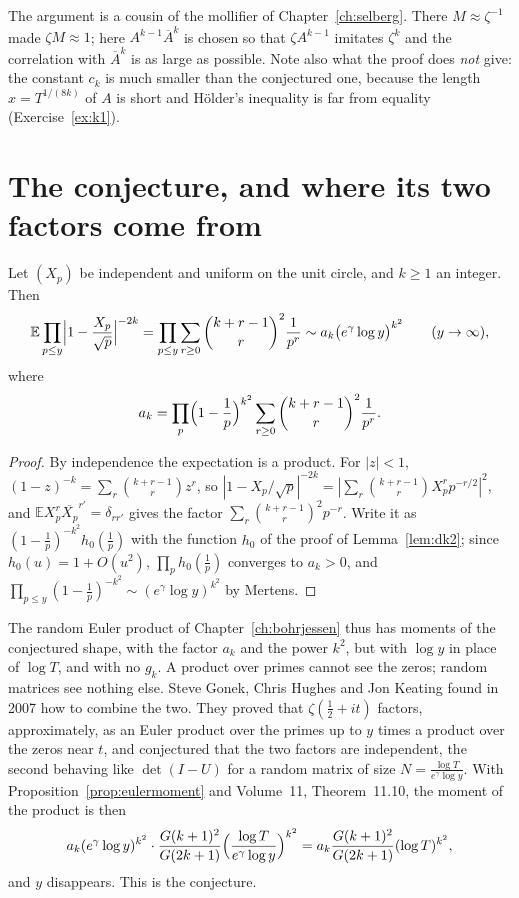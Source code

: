The argument is a cousin of the mollifier of Chapter~\ref{ch:selberg}. There $M\approx\zeta^{-1}$ made $\zeta M\approx1$; here $A^{k-1}\overline A^k$ is chosen so that $\zeta A^{k-1}$ imitates $\zeta^k$ and the correlation with $\overline A^k$ is as large as possible. Note also what the proof does \emph{not} give: the constant $c_k$ is much smaller than the conjectured one, because the length $x=T^{1/(8k)}$ of $A$ is short and Hölder's inequality is far from equality (Exercise~\ref{ex:k1}).

\section{The conjecture, and where its two factors come from}

\begin{proposition}\label{prop:eulermoment}
Let $(X_p)$ be independent and uniform on the unit circle, and $k\ge1$ an integer. Then
\[
\mathbb E\prod_{p\le y}\Bigl|1-\frac{X_p}{\sqrt p}\Bigr|^{-2k}=\prod_{p\le y}\sum_{r\ge0}\binom{k+r-1}r^2\frac1{p^r}\sim a_k\bigl(e^\gamma\log y\bigr)^{k^2}\qquad(y\to\infty),
\]
where
\[
a_k=\prod_p\Bigl(1-\frac1p\Bigr)^{k^2}\sum_{r\ge0}\binom{k+r-1}r^2\frac1{p^r}.
\]
\end{proposition}
\begin{proof}
By independence the expectation is a product. For $|z|<1$, $(1-z)^{-k}=\sum_r\binom{k+r-1}rz^r$, so $|1-X_p/\sqrt p|^{-2k}=|\sum_r\binom{k+r-1}rX_p^rp^{-r/2}|^2$, and $\mathbb EX_p^r\overline{X_p}^{r'}=\delta_{rr'}$ gives the factor $\sum_r\binom{k+r-1}r^2p^{-r}$. Write it as $(1-\frac1p)^{-k^2}h_0(\frac1p)$ with the function $h_0$ of the proof of Lemma~\ref{lem:dk2}; since $h_0(u)=1+O(u^2)$, $\prod_ph_0(\frac1p)$ converges to $a_k>0$, and $\prod_{p\le y}(1-\frac1p)^{-k^2}\sim(e^\gamma\log y)^{k^2}$ by Mertens.
\end{proof}

The random Euler product of Chapter~\ref{ch:bohrjessen} thus has moments of the conjectured shape, with the factor $a_k$ and the power $k^2$, but with $\log y$ in place of $\log T$, and with no $g_k$. A product over primes cannot see the zeros; random matrices see nothing else. Steve Gonek, Chris Hughes and Jon Keating found in 2007 how to combine the two. They proved that $\zeta(\frac12+it)$ factors, approximately, as an Euler product over the primes up to $y$ times a product over the zeros near $t$, and conjectured that the two factors are independent, the second behaving like $\det(I-U)$ for a random matrix of size $N=\frac{\log T}{e^\gamma\log y}$. With Proposition~\ref{prop:eulermoment} and Volume~11, Theorem~11.10, the moment of the product is then
\[
a_k(e^\gamma\log y)^{k^2}\cdot\frac{G(k+1)^2}{G(2k+1)}\Bigl(\frac{\log T}{e^\gamma\log y}\Bigr)^{k^2}=a_k\frac{G(k+1)^2}{G(2k+1)}(\log T)^{k^2},
\]
and $y$ disappears. This is the conjecture.

